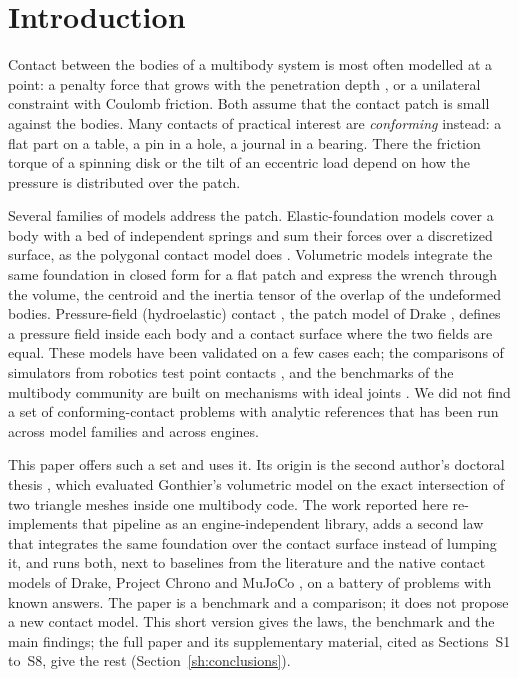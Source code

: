 
\section{Introduction}\label{sh:introduction}

Contact between the bodies of a multibody system is most often modelled at a point: a penalty
force that grows with the penetration depth \cite{HuntCrossley1975}, or a unilateral
constraint with Coulomb friction. Both assume that the contact patch is small against the bodies.
Many contacts of practical interest are \emph{conforming} instead: a flat part on a table, a
pin in a hole, a journal in a bearing. There the friction torque of a spinning disk or the
tilt of an eccentric load depend on how the pressure is distributed over the patch.

Several families of models address the patch. Elastic-foundation models cover a body with a
bed of independent springs and sum their forces over a discretized surface,
as the polygonal contact model does \cite{Hippmann2004}. Volumetric models
\cite{Gonthier2005,Gonthier2007thesis} integrate the same foundation in closed form for a flat
patch and express the wrench through the volume, the centroid and the inertia tensor of the
overlap of the undeformed bodies. Pressure-field
(hydroelastic) contact \cite{Elandt2019}, the patch model of Drake \cite{Drake},
defines a pressure field inside each body and a contact surface where the two fields are equal.
These models have been validated on a few cases each; the comparisons of
simulators from robotics test point contacts \cite{Erez2015}, and the benchmarks of the
multibody community are built on mechanisms with ideal joints \cite{Gonzalez2006}. We did
not find a set of conforming-contact problems with analytic references that has been run
across model families and across engines.

This paper offers such a set and uses it. Its origin is the second author's doctoral thesis
\cite{Vilela2018}, which evaluated Gonthier's volumetric model on the exact intersection of two
triangle meshes inside one multibody code. The work reported here re-implements that pipeline
as an engine-independent library, adds a second law that integrates the same foundation over
the contact surface instead of lumping it, and runs both, next to baselines from the
literature and the native contact models of Drake, Project Chrono \cite{Tasora2016} and MuJoCo
\cite{Todorov2012}, on a battery of problems with known answers. The paper is a benchmark and
a comparison; it does not propose a new contact model. This short version gives the laws, the
benchmark and the main findings; the full paper and its supplementary material, cited as
Sections~S1 to~S8, give the rest (Section~\ref{sh:conclusions}).

